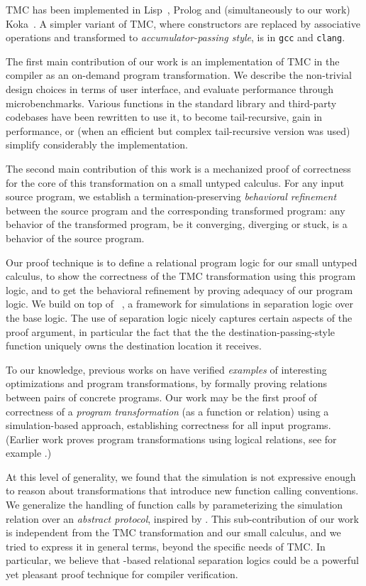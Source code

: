 TMC has been implemented in Lisp~\citep*{risch-73,friedman-wise-75}, Prolog and (simultaneously to our work) Koka~\citep*{tmc-koka-2023}. A simpler variant of TMC, where constructors are replaced by associative operations and transformed to \emph{accumulator-passing style}, is in \texttt{gcc} and \texttt{clang}.

The first main contribution of our work is an implementation of TMC in the \OCaml compiler as an on-demand program transformation.
%
We describe the non-trivial design choices in terms of user interface, and evaluate performance through microbenchmarks.
%
Various functions in the standard library and third-party codebases have been rewritten to use it, to become tail-recursive, gain in performance, or (when an efficient but complex tail-recursive version was used) simplify considerably the implementation.

The second main contribution of this work is a mechanized proof of correctness for the core of this transformation on a small untyped calculus.
%
For any input source program, we establish a termination-preserving \emph{behavioral refinement} between the source program and the corresponding transformed program: any behavior of the transformed program, be it converging, diverging or stuck, is a behavior of the source program.

Our proof technique is to define a relational program logic for our small untyped calculus, to show the correctness of the TMC transformation using this program logic, and to get the behavioral refinement by proving adequacy of our program logic. We build on top of \Simuliris~\citep*{simuliris-2022}, a framework for simulations in separation logic over the \Iris base logic. The use of separation logic nicely captures certain aspects of the proof argument, in particular the fact that the the destination-passing-style function uniquely owns the destination location it receives.

To our knowledge, previous works on \Simuliris have verified \emph{examples} of interesting optimizations and program transformations, by formally proving relations between pairs of concrete programs. Our work may be the first proof of correctness of a \emph{program transformation} (as a function or relation) using a simulation-based approach, establishing correctness for all input programs. (Earlier \Iris work proves program transformations using logical relations, see for example \citet*{tassarotti-2017}.)

At this level of generality, we found that the \Simuliris simulation is not expressive enough to reason about transformations that introduce new function calling conventions.
%
We generalize the \Simuliris handling of function calls by parameterizing the simulation relation over an \emph{abstract protocol}, inspired by \citet*{protocols-2021}.
%
This sub-contribution of our work is independent from the TMC transformation and our small calculus,
and we tried to express it in general terms, beyond the specific needs of TMC.
%
In particular, we believe that \Iris-based relational separation logics could be a powerful yet pleasant proof technique for compiler verification.

